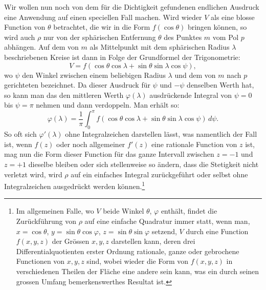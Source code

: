 \documentclass[11pt]{article}
\newcommand{\dd}{\,d}
\begin{document}
Wir wollen nun noch von dem für die Dichtigkeit gefundenen endlichen Ausdruck eine Anwendung auf einen speciellen Fall machen. Wird wieder $V$ als eine blosse Function von $\theta$ betrachtet, die wir in die Form $f(\cos\theta)$ bringen können, so wird auch $\rho$ nur von der sphärischen Entfernung $\theta$ des Punktes $m$ vom Pol $p$ abhängen. Auf dem von $m$ als Mittelpunkt mit dem sphärischen Radius $\lambda$ beschriebenen Kreise ist dann in Folge der Grundformel der Trigonometrie:
\[
 V=f(\cos\theta\cos\lambda+\sin\theta\sin\lambda\cos\psi),
\]
wo $\psi$ den Winkel zwischen einem beliebigen Radius $\lambda$ und dem von $m$ nach $p$ gerichteten bezeichnet. Da dieser Ausdruck für $\psi$ und $-\psi$ denselben Werth hat, so kann man das den mittleren Werth $\varphi(\lambda)$ ausdrückende Integral von $\psi=0$ bis $\psi=\pi$ nehmen und dann verdoppeln. Man erhält so:
\[
 \varphi(\lambda)=\frac1\pi\int_0^\pi f(\cos\theta\cos\lambda+\sin\theta\sin\lambda\cos\psi)\dd\psi.
\]
So oft sich $\varphi'(\lambda)$ ohne Integralzeichen darstellen lässt, was namentlich der Fall ist, wenn $f(z)$ oder noch allgemeiner $f'(z)$ eine rationale Function von $z$ ist, mag nun die Form dieser Function für das ganze Intervall zwischen $z=-1$ und $z=+1$ dieselbe bleiben oder sich stellenweise so ändern, dass die Stetigkeit nicht verletzt wird, wird $\rho$ auf ein einfaches Integral zurückgeführt oder selbst ohne Integralzeichen ausgedrückt werden können.\footnote{Im allgemeinen Falle, wo $V$ beide Winkel $\theta$, $\varphi$ enthält, findet die Zurückführung von $\rho$ auf eine einfache Quadratur immer statt, wenn man, $x=\cos\theta$, $y=\sin\theta\cos\varphi$, $z=\sin\theta\sin\varphi$ setzend, $V$ durch eine Function $f(x,y,z)$ der Grössen $x,y,z$ darstellen kann, deren drei Differentialquotienten erster Ordnung rationale, ganze oder gebrochene Functionen von $x,y,z$ sind, wobei wieder die Form von $f(x,y,z)$ in verschiedenen Theilen der Fläche eine andere sein kann, was ein durch seinen grossen Umfang bemerkenswerthes Resultat ist.}
\end{document}
